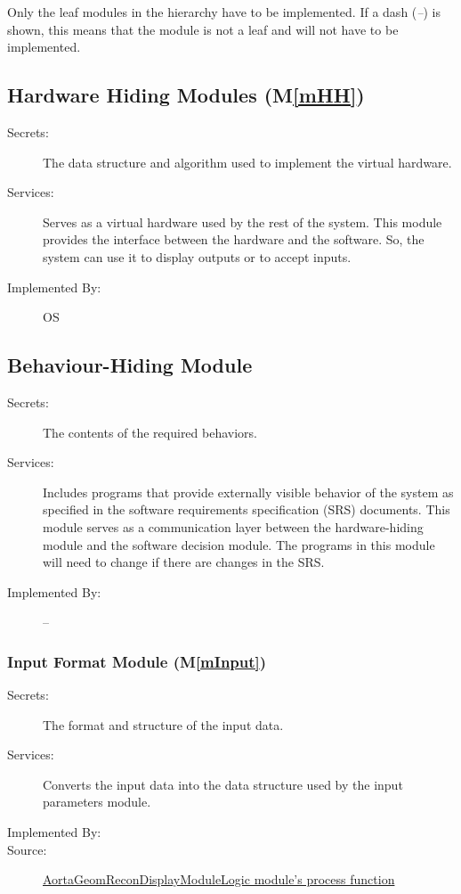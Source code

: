 \documentclass[12pt, titlepage]{article}
\newcommand{\mref}[1]{M\ref{#1}}
\begin{document}
Only the leaf modules in the hierarchy have to be implemented. If a dash
(\emph{--}) is shown, this means that the module is not a leaf and will not have
to be implemented.

\subsection{Hardware Hiding Modules (\mref{mHH})}

\begin{description}
\item[Secrets:]The data structure and algorithm used to implement the virtual
  hardware.
\item[Services:]Serves as a virtual hardware used by the rest of the
  system. This module provides the interface between the hardware and the
  software. So, the system can use it to display outputs or to accept inputs.
\item[Implemented By:] OS
\end{description}

\subsection{Behaviour-Hiding Module}

\begin{description}
\item[Secrets:]The contents of the required behaviors.
\item[Services:]Includes programs that provide externally visible behavior of
  the system as specified in the software requirements specification (SRS)
  documents. This module serves as a communication layer between the
  hardware-hiding module and the software decision module. The programs in this
  module will need to change if there are changes in the SRS.
\item[Implemented By:] --
\end{description}

\subsubsection{Input Format Module (\mref{mInput})}
\begin{description}
\item[Secrets:]The format and structure of the input data.
\item[Services:]Converts the input data into the data structure used by the input parameters module.
\item[Implemented By:] \progname{}
\item[Source:] \href{https://joviel25.github.io/AortaGR-design-document/AortaGeomReconDisplayModule.html#AortaGeomReconDisplayModule.AortaGeomReconDisplayModuleLogic.process}{AortaGeomReconDisplayModuleLogic module's process function}
\end{description}
\end{document}
